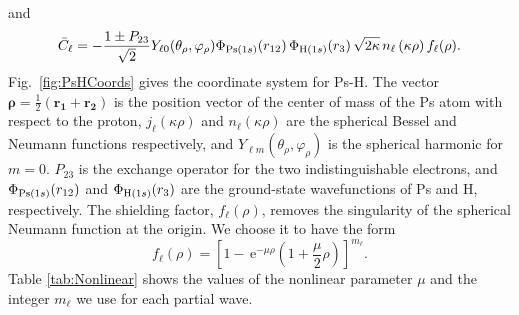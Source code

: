 \documentclass[preprint,showpacs,showkeys,preprintnumbers,amsmath,amssymb,longbibliography,pra,aps]{revtex4-1}
\newcommand{\ee} {\,\text{e}}
\begin{document}
and
\begin{equation}
\label{eq:CBar}
\bar{C}_\ell = -\frac{1\pm P_{23}}{\sqrt{2}}Y_{\ell 0}(\theta_\rho,
  \varphi_\rho)\Phi_{{\rm{Ps}}(1s)}\!\left(r_{12}\right) \Phi_{{\rm{H}}(1s)}\!\left(r_3\right)
  \sqrt{2\kappa} \,n_\ell\left(\kappa\rho\right) f_\ell(\rho).
\end{equation}
Fig.~\ref{fig:PsHCoords} gives the
coordinate system for Ps-H. The vector
$\bm{\rho} = \frac{1}{2}\left(\bm{r_1} + \bm{r_2}\right)$ is the position
vector of the center of mass of the Ps atom with respect to the proton,
$j_\ell\left(\kappa\rho\right)$ and $n_\ell\left(\kappa\rho\right)$ are
the spherical Bessel and Neumann functions respectively, and
$Y_{\ell m}(\theta_\rho, \varphi_\rho)$ is the spherical harmonic for $m = 0$.
$P_{23}$ is the exchange operator for the two indistinguishable electrons, and
$\Phi_{{\rm{Ps}}(1s)}\!\left(r_{12}\right)$ and
$\Phi_{{\rm{H}}(1s)}\!\left(r_3\right)$ are the ground-state wavefunctions
of Ps and H, respectively. The shielding factor, $f_\ell(\rho)$,
removes the singularity of the spherical Neumann function
at the origin. We choose it to have the form
\begin{equation}
f_\ell(\rho) = \left[1 - \ee^{-\mu \rho} \left(1+\frac{\mu}{2}\rho\right)
\right]^{m_\ell}.
\label{eq:PartialWaveShielding}
\end{equation}
Table \ref{tab:Nonlinear} shows the values of the
nonlinear parameter $\mu$ and the integer $m_\ell$ we use for each partial
wave.
\end{document}
